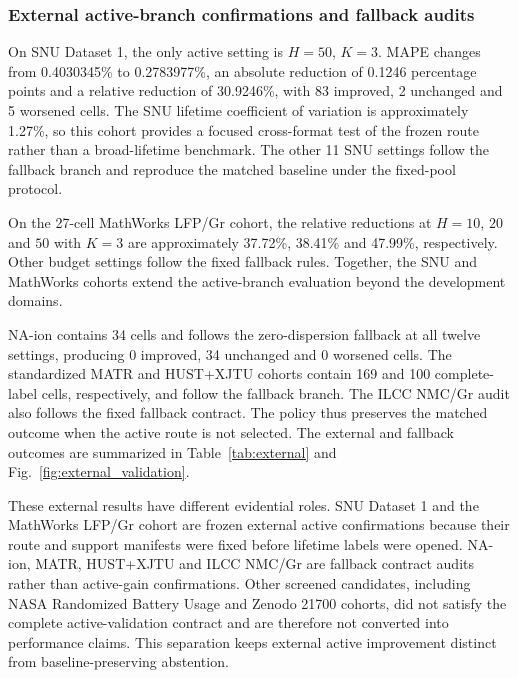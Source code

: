 \documentclass[preprint,12pt]{elsarticle}
\begin{document}
\subsubsection{External active-branch confirmations and fallback audits}

On SNU Dataset 1, the only active setting is $H=50$, $K=3$. MAPE changes from 0.4030345\% to 0.2783977\%, an absolute reduction of 0.1246 percentage points and a relative reduction of 30.9246\%, with 83 improved, 2 unchanged and 5 worsened cells. The SNU lifetime coefficient of variation is approximately 1.27\%, so this cohort provides a focused cross-format test of the frozen route rather than a broad-lifetime benchmark. The other 11 SNU settings follow the fallback branch and reproduce the matched baseline under the fixed-pool protocol.

On the 27-cell MathWorks LFP/Gr cohort, the relative reductions at $H=10$, $20$ and $50$ with $K=3$ are approximately 37.72\%, 38.41\% and 47.99\%, respectively. Other budget settings follow the fixed fallback rules. Together, the SNU and MathWorks cohorts extend the active-branch evaluation beyond the development domains.

NA-ion contains 34 cells and follows the zero-dispersion fallback at all twelve settings, producing 0 improved, 34 unchanged and 0 worsened cells. The standardized MATR and HUST+XJTU cohorts contain 169 and 100 complete-label cells, respectively, and follow the fallback branch. The ILCC NMC/Gr audit also follows the fixed fallback contract. The policy thus preserves the matched outcome when the active route is not selected. The external and fallback outcomes are summarized in Table~\ref{tab:external} and Fig.~\ref{fig:external_validation}.

These external results have different evidential roles. SNU Dataset 1 and the MathWorks LFP/Gr cohort are frozen external active confirmations because their route and support manifests were fixed before lifetime labels were opened. NA-ion, MATR, HUST+XJTU and ILCC NMC/Gr are fallback contract audits rather than active-gain confirmations. Other screened candidates, including NASA Randomized Battery Usage and Zenodo 21700 cohorts, did not satisfy the complete active-validation contract and are therefore not converted into performance claims. This separation keeps external active improvement distinct from baseline-preserving abstention.
\end{document}
